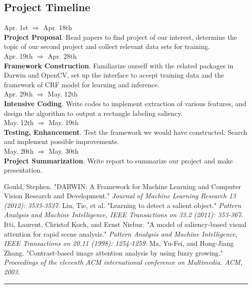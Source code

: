\documentclass[12pt,a4paper]{article}
\newcommand{\Hrule}{\textcolor{blue}{\rule{\linewidth}{0.5mm}}}
\begin{document}
\begin{multicols}{2}
\section{Project Timeline}
Apr. 1st $\Rightarrow$ Apr. 18th \\
\textbf{Project Proposal}. Read papers to find project of our interest, determine the topic of our second project and collect relevant data sets for training. \\[0.2cm]
Apr. 19th $\Rightarrow$ Apr. 28th  \\
 \textbf{Framework Construction}. Familiarize ourself with the related packages in Darwin and OpenCV, set up the interface to accept training data and the framework of CRF model for learning and inference.   \\[0.2cm]
Apr. 29th $\Rightarrow$ May. 12th \\
 \textbf{Intensive Coding}. Write codes to implement extraction of various features, and design the algorithm to output a rectangle labeling saliency. \\[0.2cm]
May. 12th $\Rightarrow$ May. 19th \\
\textbf{Testing, Enhancement}. Test the framework we would have constructed. Search and implement possible improvements. \\[0.2cm] 
May. 20th $\Rightarrow$ May. 30th \\
\textbf{Project Summarization}. Write report to summarize our project and make presentation. \\
\begin{thebibliography}{8}
    \footnotesize
     Gould, Stephen. "DARWIN: A Framework for Machine Learning and Computer Vision Research and Development." \textit{Journal of Machine Learning Research 13 (2012): 3533-3537}. 
     Liu, Tie, et al. "Learning to detect a salient object." \textit{Pattern Analysis and Machine Intelligence, IEEE Transactions on 33.2 (2011): 353-367}. 
     Itti, Laurent, Christof Koch, and Ernst Niebur. "A model of saliency-based visual attention for rapid scene analysis."\textit{ Pattern Analysis and Machine Intelligence, IEEE Transactions on 20.11 (1998): 1254-1259}.
     Ma, Yu-Fei, and Hong-Jiang Zhang. "Contrast-based image attention analysis by using fuzzy growing."\textit{ Proceedings of the eleventh ACM international conference on Multimedia. ACM, 2003}. 
\end{thebibliography}

\end{multicols}

\vfill\Hrule
\end{document}
